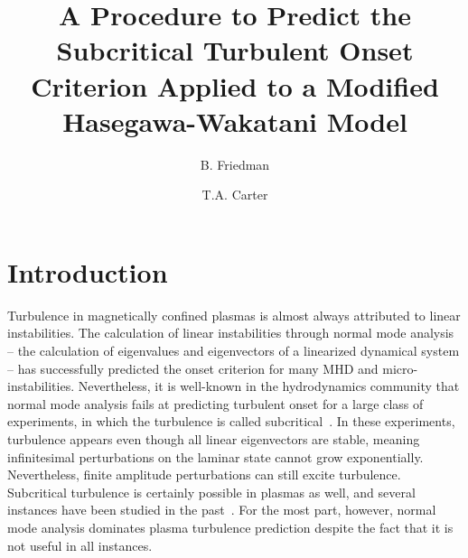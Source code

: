 \documentclass[twocolumn,showkeys,superscriptaddress]{revtex4}
\begin{document}
\title{A Procedure to Predict the Subcritical Turbulent Onset Criterion Applied to a Modified Hasegawa-Wakatani Model}

\author{B. Friedman}



\author{T.A. Carter}




\begin{abstract}

\end{abstract}

\maketitle

\section{Introduction}

Turbulence in magnetically confined plasmas is almost always attributed to linear instabilities. The calculation of linear instabilities through normal mode analysis
-- the calculation of eigenvalues and eigenvectors of a linearized dynamical system -- has successfully predicted the onset criterion for many MHD and micro-instabilities.
Nevertheless, it is well-known in the hydrodynamics community that normal mode analysis fails at predicting turbulent onset for a large class of experiments, in which the
turbulence is called subcritical~\cite{drazin1981}. 
In these experiments, turbulence appears even though all linear eigenvectors are stable, meaning infinitesimal perturbations on the laminar state cannot grow exponentially. 
Nevertheless, finite amplitude perturbations can still excite turbulence.
Subcritical turbulence is certainly possible in plasmas as well, and several instances have been studied in the 
past~\cite{waltz1985,scott1990,nordman1993,biskamp1995,drake1995,itoh1996,camargo1998,krommes1999,camporeale2009,schekochihin2012,highcock2012}. 
For the most part, however, normal mode analysis dominates plasma turbulence prediction despite the fact that it is not useful in all instances.
\end{document}
